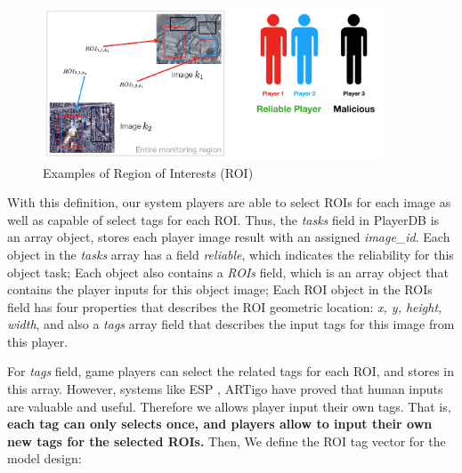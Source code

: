 \begin{figure}[htp]
\centering
\includegraphics[width=0.9\textwidth]{figures/roi}
\caption{Examples of Region of Interests (ROI)}
\label{fig:roi}
\end{figure}

With this definition, our system players are able to select ROIs for each image as well as capable of select tags for each ROI.
Thus, the \emph{tasks} field in PlayerDB is an array object, stores each player image result with an assigned \emph{image\_id}.
Each object in the \emph{tasks} array has a field \emph{reliable}, which indicates the reliability for this object task;
Each object also contains a \emph{ROIs} field, which is an array object that contains the player inputs for this object image;
Each ROI object in the ROIs field has four properties that describes the ROI geometric location: \emph{x, y, height, width}, and 
also a \emph{tags} array field that describes the input tags for this image from this player.


For \emph{tags} field, game players can select the related tags for each ROI, and stores in this array. 
However, systems like ESP \cite{von2004labeling}, ARTigo \cite{wieser2013artigo} have proved that 
human inputs are valuable and useful. Therefore we allows player input their own tags. That is, 
\textbf{each tag can only selects once, and players allow to input their own new tags for the selected ROIs.} 
Then, We define the ROI tag vector for the model design:


